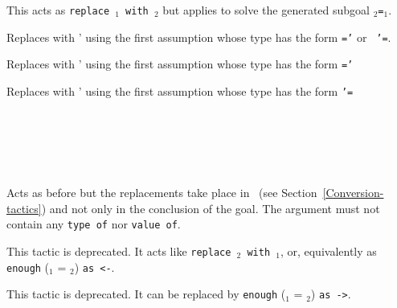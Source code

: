 \begin{ErrMsgs}
\item {}
\end{ErrMsgs}

\begin{Variants}

\item {}

  This acts as {\tt replace \term$_1$ with \term$_2$} but applies {\tt \tac}
  to solve the generated subgoal {\tt \term$_2$=\term$_1$}.

\item {}

  Replaces {\term} with {\term'} using the
  first assumption whose type has the form {\tt \term=\term'} or {\tt
    \term'=\term}.

\item {}

  Replaces {\term} with {\term'} using the
  first assumption whose type has the form {\tt \term=\term'}

\item {}

  Replaces {\term} with {\term'} using the
  first assumption whose type has the form {\tt \term'=\term}

\item {}\\
    {}\\
    {}\\
    {}\\
    {}

    Acts as before but the replacements take place in
    ~(see Section~\ref{Conversion-tactics}) and not only
    in the conclusion of the goal.
    The  argument must not contain any \texttt{type of} nor \texttt{value of}.

\item {}

This tactic is deprecated. It acts like {\tt replace {\term$_2$} with
  {\term$_1$}}, or, equivalently as {\tt enough} (\term$_1$ =
\term$_2$) {\tt as <-}.

\item {}

This tactic is deprecated. It can be replaced by {\tt enough}
(\term$_1$ = \term$_2$) {\tt as ->}.

\end{Variants}

